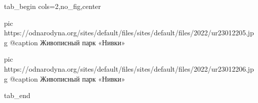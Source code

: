  
 
 
 
 


\ifcmt
  tab_begin cols=2,no_fig,center

     pic https://odnarodyna.org/sites/default/files/sites/default/files/2022/ur23012205.jpg
		 @caption  Живописный парк «Нивки»

		 pic https://odnarodyna.org/sites/default/files/sites/default/files/2022/ur23012206.jpg
		 @caption  Живописный парк «Нивки»

  tab_end
\fi
